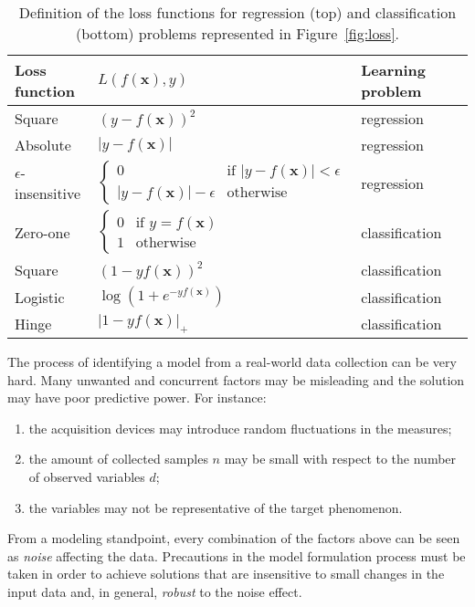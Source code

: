 	  \begin{table}[!h]
	  	\centering
	  	\caption{Definition of the loss functions for regression (top) and classification (bottom) problems represented in Figure~\ref{fig:loss}.}\label{tab:losses}
	  	\begin{tabular}{@{}ll@{}ll@{}}
	  		\toprule
	  		Loss function & $L(f(\bm{x}),y)$  & Learning problem           \\ \midrule
	  		Square                   & $(y - f(\bm{x}))^2$ & regression \\
	  		Absolute                 & $|y - f(\bm{x})|$ & regression   \\
	  		$\epsilon$-insensitive   & $\begin{cases}
	  		0 & \text{if } |y-f(\bm{x})| < \epsilon\\
	  		|y-f(\bm{x})| - \epsilon & \text{otherwise}
	  		\end{cases} $        & regression                 \\
	  		\midrule
	  		Zero-one               & $\begin{cases}
	  		0 & \text{if } y = f(\bm{x})\\
	  		1 & \text{otherwise}
	  		\end{cases}$ & classification \\
	  		Square                 & $(1 - yf(\bm{x}))^2$ & classification  \\
	  		Logistic                 & $\log(1 + e^{-yf(\bm{x})})$ & classification  \\
	  		Hinge                 & $|1 - yf(\bm{x})|_+$ & classification  \\
	  		\bottomrule
	  	\end{tabular}
	  \end{table}

	  The process of identifying a model from a real-world data collection can be very hard. Many unwanted and concurrent factors may be misleading and the solution may have poor predictive power.
		For instance:
		\begin{enumerate}
			\item the acquisition devices may introduce random fluctuations in the measures;
			\item the amount of collected samples $n$ may be small with respect to the number of observed variables $d$;
			\item the variables may not be representative of the target phenomenon.
	  \end{enumerate}
		From a modeling standpoint, every combination of the factors above can be seen as \textit{noise} affecting the data.
		Precautions in the model formulation process must be taken in order to achieve solutions that are insensitive to small changes in the input data and, in general, \textit{robust} to the noise effect.

